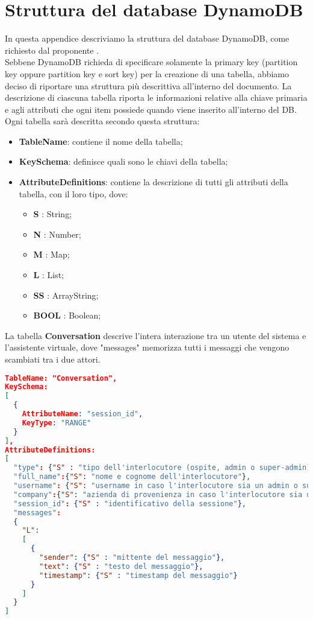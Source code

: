 \section{Struttura del database DynamoDB}
In questa appendice descriviamo la struttura del database DynamoDB, come richiesto dal proponente \PROPONENTE. \\
Sebbene DynamoDB richieda di specificare solamente la primary key (partition key oppure partition key e sort key) per la creazione di una tabella, abbiamo deciso di riportare una struttura più descrittiva all'interno del documento. La descrizione di ciascuna tabella riporta le informazioni relative alla chiave primaria e agli attributi che ogni item possiede quando viene inserito all'interno del DB.
Ogni tabella sarà descritta secondo questa struttura:
\begin{itemize}
 \item \textbf{TableName}: contiene il nome della tabella;
 \item \textbf{KeySchema}: definisce quali sono le chiavi della tabella;
 \item \textbf{AttributeDefinitions}: contiene la descrizione di tutti gli attributi della tabella, con il loro tipo, dove:
 \begin{itemize}
  \item \textbf{S} : String;
  \item \textbf{N} : Number;
  \item \textbf{M} : Map;
  \item \textbf{L} : List;
  \item \textbf{SS} : ArrayString;
  \item \textbf{BOOL} : Boolean;
 \end{itemize}
\end{itemize}
La tabella \textbf{Conversation} descrive l'intera interazione tra un utente del sistema e l'assistente virtuale, dove "messages" memorizza tutti i messaggi che vengono scambiati tra i due attori.
\begin{lstlisting}[language=json,firstnumber=1]
TableName: "Conversation",
KeySchema:
[
  {
    AttributeName: "session_id",
    KeyType: "RANGE"
  }
],
AttributeDefinitions:
[
  "type": {"S" : "tipo dell'interlocutore (ospite, admin o super-admin)"},
  "full_name":{"S": "nome e cognome dell'interlocutore"},
  "username": {"S": "username in caso l'interlocutore sia un admin o super-admin"},
  "company":{"S": "azienda di provenienza in caso l'interlocutore sia un ospite"},
  "session_id": {"S" : "identificativo della sessione"},
  "messages":
  {
    "L":
    [
      {
        "sender": {"S" : "mittente del messaggio"},
        "text": {"S" : "testo del messaggio"},
        "timestamp": {"S" : "timestamp del messaggio"}
      }
    ]
  }
]
\end{lstlisting}
